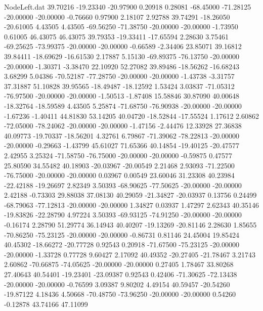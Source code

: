 \begin{filecontents}{NodeLeft.dat}
  39.70216  -19.23340  -20.97900     0.20918    0.28081  -68.45000  -71.28125  -20.00000  -20.00000   -0.76660    0.97900    2.18107    2.92788
  39.74291  -18.26050  -20.61005     4.43505    4.43505  -69.56250  -71.38750  -20.00000  -20.00000   -1.73950    0.61005   46.43075   46.43075
  39.79353  -19.33411  -17.65594     2.28630    3.75461  -69.25625  -73.99375  -20.00000  -20.00000   -0.66589   -2.34406   23.85071   39.16812
  39.84411  -18.69629  -16.61530     2.17887    5.15130  -69.89375  -76.13750  -20.00000  -20.00000   -1.30371   -3.38470   22.10920   52.27082
  39.89486  -18.56262  -16.68243     3.68299    5.04386  -70.52187  -77.28750  -20.00000  -20.00000   -1.43738   -3.31757   37.31887   51.10828
  39.95565  -18.49487  -18.12592     1.53424    3.03837  -71.05312  -76.97500  -20.00000  -20.00000   -1.50513   -1.87408   15.58846   30.87090
  40.00648  -18.32764  -18.59589     4.43505    5.25874  -71.68750  -76.90938  -20.00000  -20.00000   -1.67236   -1.40411   44.81830   53.14205
  40.04720  -18.52844  -17.55524     1.17612    2.60862  -72.05000  -78.24062  -20.00000  -20.00000   -1.47156   -2.44476   12.33928   27.36838
  40.09773  -19.70337  -18.56201     4.32761    6.79867  -71.39062  -78.22813  -20.00000  -20.00000   -0.29663   -1.43799   45.61027   71.65366
  40.14854  -19.40125  -20.47577     2.42955    3.25324  -71.58750  -76.75000  -20.00000  -20.00000   -0.59875    0.47577   25.80590   34.55482
  40.18903  -20.03967  -20.00549     2.21468    2.93093  -71.22500  -76.75000  -20.00000  -20.00000    0.03967    0.00549   23.60046   31.23308
  40.23984  -22.42188  -19.26697     2.82349    3.50393  -68.90625  -77.50625  -20.00000  -20.00000    2.42188   -0.73303   29.88038   37.08130
  40.29059  -21.34827  -20.03937     0.13756    0.24499  -68.79063  -77.12813  -20.00000  -20.00000    1.34827    0.03937    1.47297    2.62343
  40.35146  -19.83826  -22.28790     4.97224    3.50393  -69.93125  -74.91250  -20.00000  -20.00000   -0.16174    2.28790   51.29774   36.14943
  40.40207  -19.13269  -20.81146     2.28630    1.85655  -70.86250  -75.23125  -20.00000  -20.00000   -0.86731    0.81146   24.45004   19.85424
  40.45302  -18.66272  -20.77728     0.92543    0.20918  -71.67500  -75.23125  -20.00000  -20.00000   -1.33728    0.77728    9.60427    2.17092
  40.49352  -20.27405  -21.78467     3.21743    2.60862  -70.66875  -74.05625  -20.00000  -20.00000    0.27405    1.78467   33.80268   27.40643
  40.54401  -19.23401  -23.09387     0.92543    0.42406  -71.30625  -72.13438  -20.00000  -20.00000   -0.76599    3.09387    9.80202    4.49154
  40.59457  -20.54260  -19.87122     4.18436    4.50668  -70.48750  -73.96250  -20.00000  -20.00000    0.54260   -0.12878   43.74166   47.11099

\end{filecontents}

